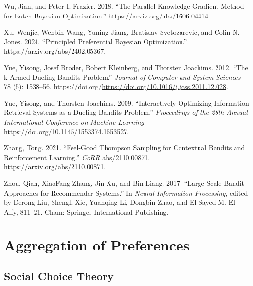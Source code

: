 \documentclass[
  letterpaper,
  numbers=noenddot,
  DIV=11]{scrreprt}
\newlength{\cslhangindent}
\newenvironment{CSLReferences}[2] %
 {\begin{list}{}{%
  \setlength{\itemindent}{0pt}
  \setlength{\leftmargin}{0pt}
  \setlength{\parsep}{0pt}
  \ifodd #1
   \setlength{\leftmargin}{\cslhangindent}
   \setlength{\itemindent}{-1\cslhangindent}
  \fi
  \setlength{\itemsep}{#2\baselineskip}}}
 {\end{list}}
\let\oldchapter\chapter
\def\chapter{%
  \setcounter{sidenote}{1}%
  \oldchapter
}
\theoremstyle{definition}
\theoremstyle{plain}
\theoremstyle{plain}
\theoremstyle{remark}
\begin{document}
\begin{CSLReferences}{1}{0}
Wu, Jian, and Peter I. Frazier. 2018. {``The Parallel Knowledge Gradient
Method for Batch Bayesian Optimization.''}
\url{https://arxiv.org/abs/1606.04414}.

Xu, Wenjie, Wenbin Wang, Yuning Jiang, Bratislav Svetozarevic, and Colin
N. Jones. 2024. {``Principled Preferential Bayesian Optimization.''}
\url{https://arxiv.org/abs/2402.05367}.

Yue, Yisong, Josef Broder, Robert Kleinberg, and Thorsten Joachims.
2012. {``The k-Armed Dueling Bandits Problem.''} \emph{Journal of
Computer and System Sciences} 78 (5): 1538--56.
https://doi.org/\url{https://doi.org/10.1016/j.jcss.2011.12.028}.

Yue, Yisong, and Thorsten Joachims. 2009. {``Interactively Optimizing
Information Retrieval Systems as a Dueling Bandits Problem.''}
\emph{Proceedings of the 26th Annual International Conference on Machine
Learning}. \url{https://doi.org/10.1145/1553374.1553527}.

Zhang, Tong. 2021. {``Feel-Good Thompson Sampling for Contextual Bandits
and Reinforcement Learning.''} \emph{CoRR} abs/2110.00871.
\url{https://arxiv.org/abs/2110.00871}.

Zhou, Qian, XiaoFang Zhang, Jin Xu, and Bin Liang. 2017. {``Large-Scale
Bandit Approaches for Recommender Systems.''} In \emph{Neural
Information Processing}, edited by Derong Liu, Shengli Xie, Yuanqing Li,
Dongbin Zhao, and El-Sayed M. El-Alfy, 811--21. Cham: Springer
International Publishing.

\end{CSLReferences}


\chapter{Aggregation of Preferences}\label{aggregation-of-preferences}

\section{Social Choice Theory}\label{sec-choices-aggregation}
\end{document}

